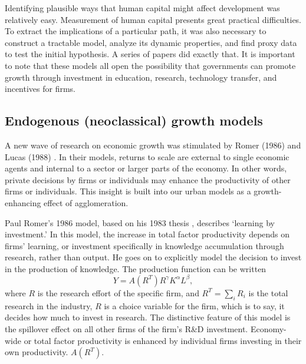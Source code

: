 


Identifying  plausible ways that human capital might affect development was relatively easy. Measurement of human capital presents great practical difficulties. To extract the implications of a particular path, it was also necessary to construct a tractable model, analyze its dynamic properties, and find proxy data to test the initial hypothesis.   A series of papers did exactly that. It is important to note that these models all open the possibility that governments can  promote growth through investment in education, research, technology transfer, and incentives for firms.

\subsection{Endogenous (neoclassical) growth models}
A new wave of research on economic growth was stimulated by Romer (1986) and Lucas (1988) \cite{REF_AGAIN}. In their models, returns to scale are external to single economic agents and internal to a sector or larger parts of the economy. In other words, private decisions by firms or individuals may enhance the productivity of other firms or individuals. This insight is built into our urban models as a growth-enhancing effect of agglomeration. 


Paul Romer's 1986  model, based on his 1983 thesis \cite{GET_REF}, describes `learning by investment.' In this model, the increase in {total factor productivity} depends on firms' learning, or investment specifically in knowledge accumulation through research, rather than output. He goes on to  explicitly model the decision to invest in the production of knowledge. The production function  can be written
\[Y = A(R^T)R^\gamma  K^\alpha L^\beta, \]
where $R$ is the research effort of the specific firm, and $R^T=\sum_iR_i$ is the total research in the industry,  $R$ is a choice variable for the firm, which is to say, it decides how much to invest in research. The distinctive  feature of this model is the spillover effect on all other firms of the firm's R\&D investment. Economy-wide or  \gls{total factor productivity} is enhanced by individual firms investing in their own productivity. $A(R^T)$. %

